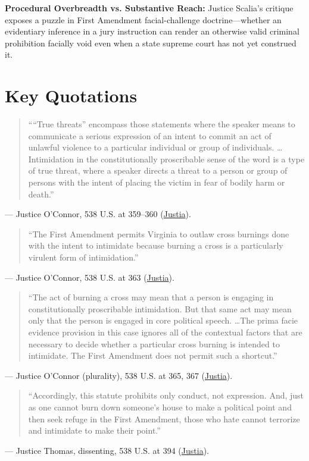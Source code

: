 \documentclass[12pt]{article}
\begin{document}
\textbf{Procedural Overbreadth vs. Substantive Reach:} Justice Scalia's critique exposes a puzzle in First Amendment facial-challenge doctrine---whether an evidentiary inference in a jury instruction can render an otherwise valid criminal prohibition facially void even when a state supreme court has not yet construed it.

\section{Key Quotations}
\begin{quote}
````True threats'' encompass those statements where the speaker means to communicate a serious expression of an intent to commit an act of unlawful violence to a particular individual or group of individuals. \dots Intimidation in the constitutionally proscribable sense of the word is a type of true threat, where a speaker directs a threat to a person or group of persons with the intent of placing the victim in fear of bodily harm or death.''
\end{quote}
\noindent --- Justice O'Connor, 538 U.S. at 359--360 (\href{https://supreme.justia.com/cases/federal/us/538/343/}{Justia}).

\begin{quote}
``The First Amendment permits Virginia to outlaw cross burnings done with the intent to intimidate because burning a cross is a particularly virulent form of intimidation.''
\end{quote}
\noindent --- Justice O'Connor, 538 U.S. at 363 (\href{https://supreme.justia.com/cases/federal/us/538/343/}{Justia}).

\begin{quote}
``The act of burning a cross may mean that a person is engaging in constitutionally proscribable intimidation. But that same act may mean only that the person is engaged in core political speech. \dots The prima facie evidence provision in this case ignores all of the contextual factors that are necessary to decide whether a particular cross burning is intended to intimidate. The First Amendment does not permit such a shortcut.''
\end{quote}
\noindent --- Justice O'Connor (plurality), 538 U.S. at 365, 367 (\href{https://supreme.justia.com/cases/federal/us/538/343/}{Justia}).

\begin{quote}
``Accordingly, this statute prohibits only conduct, not expression. And, just as one cannot burn down someone's house to make a political point and then seek refuge in the First Amendment, those who hate cannot terrorize and intimidate to make their point.''
\end{quote}
\noindent --- Justice Thomas, dissenting, 538 U.S. at 394 (\href{https://supreme.justia.com/cases/federal/us/538/343/}{Justia}).
\end{document}
